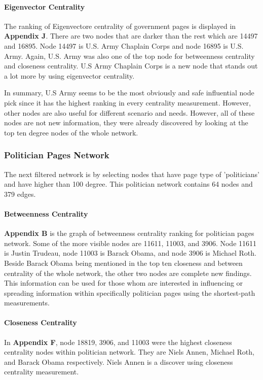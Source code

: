 \documentclass[11pt,twocolumn]{article}
\begin{document}
\paragraph{Eigenvector Centrality}
The ranking of Eigenvectore centrality of government pages is displayed in \textbf{Appendix J}. There are two nodes that are darker than the rest which are 14497 and 16895. Node 14497 is U.S. Army Chaplain Corps and node 16895 is U.S. Army. Again, U.S. Army was also one of the top node for betweenness centrality and closeness centrality. U.S Army Chaplain Corps is a new node that stands out a lot more by using eigenvector centrality.

In summary, U.S Army seems to be the most obviously and safe influential node pick since it has the highest ranking in every centrality measurement. However, other nodes are also useful for different scenario and needs. However, all of these nodes are not new information, they were already discovered by looking at the top ten degree nodes of the whole network.

\subsubsection{Politician Pages Network}
The next filtered network is by selecting nodes that have page type of 'politicians' and have higher than 100 degree. This politician network contains 64 nodes and 379 edges. 
\paragraph{Betweenness Centrality}
\textbf{Appendix B} is the graph of betweenness centrality ranking for politician pages network. Some of the more visible nodes are  11611, 11003, and 3906. Node 11611 is Justin Trudeau, node 11003 is Barack Obama, and node 3906 is Michael Roth. Beside Barack Obama being mentioned in the top ten closeness and between centrality of the whole network, the other two nodes are complete new findings. This information can be used for those whom are interested in influencing or spreading information within specifically politician pages using the shortest-path measurements. 

\paragraph{Closeness Centrality}
In \textbf{Appendix F}, node 18819, 3906, and 11003 were the highest closeness centrality nodes within politician network. They are Niels Annen, Michael Roth, and Barack Obama respectively. Niels Annen is a discover using closeness centrality measurement.
 
\end{document}
